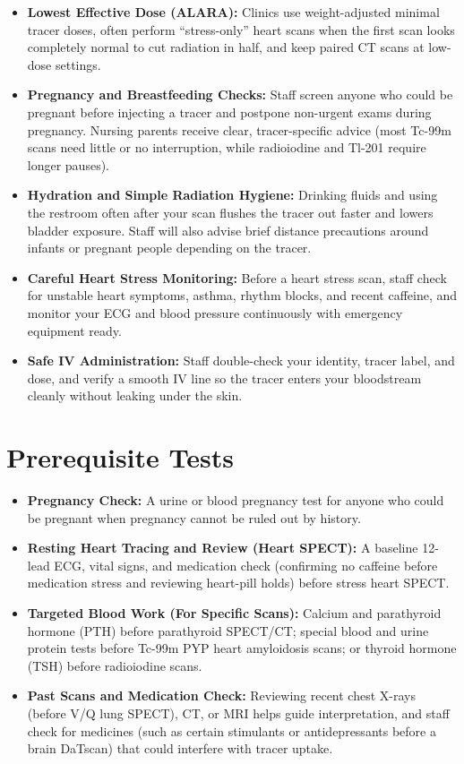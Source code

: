\begin{itemize}
    \item \textbf{Lowest Effective Dose (ALARA):} Clinics use weight-adjusted minimal tracer doses, often perform ``stress-only'' heart scans when the first scan looks completely normal to cut radiation in half, and keep paired CT scans at low-dose settings.
    \item \textbf{Pregnancy and Breastfeeding Checks:} Staff screen anyone who could be pregnant before injecting a tracer and postpone non-urgent exams during pregnancy. Nursing parents receive clear, tracer-specific advice (most Tc-99m scans need little or no interruption, while radioiodine and Tl-201 require longer pauses).
    \item \textbf{Hydration and Simple Radiation Hygiene:} Drinking fluids and using the restroom often after your scan flushes the tracer out faster and lowers bladder exposure. Staff will also advise brief distance precautions around infants or pregnant people depending on the tracer.
    \item \textbf{Careful Heart Stress Monitoring:} Before a heart stress scan, staff check for unstable heart symptoms, asthma, rhythm blocks, and recent caffeine, and monitor your ECG and blood pressure continuously with emergency equipment ready.
    \item \textbf{Safe IV Administration:} Staff double-check your identity, tracer label, and dose, and verify a smooth IV line so the tracer enters your bloodstream cleanly without leaking under the skin.
\end{itemize}

\section{Prerequisite Tests}

\begin{itemize}
    \item \textbf{Pregnancy Check:} A urine or blood pregnancy test for anyone who could be pregnant when pregnancy cannot be ruled out by history.
    \item \textbf{Resting Heart Tracing and Review (Heart SPECT):} A baseline 12-lead ECG, vital signs, and medication check (confirming no caffeine before medication stress and reviewing heart-pill holds) before stress heart SPECT.
    \item \textbf{Targeted Blood Work (For Specific Scans):} Calcium and parathyroid hormone (PTH) before parathyroid SPECT/CT; special blood and urine protein tests before Tc-99m PYP heart amyloidosis scans; or thyroid hormone (TSH) before radioiodine scans.
    \item \textbf{Past Scans and Medication Check:} Reviewing recent chest X-rays (before V/Q lung SPECT), CT, or MRI helps guide interpretation, and staff check for medicines (such as certain stimulants or antidepressants before a brain DaTscan) that could interfere with tracer uptake.
\end{itemize}

